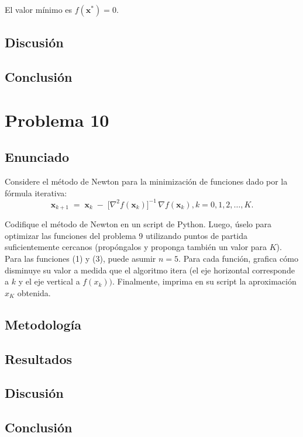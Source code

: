 \documentclass{article}
\begin{document}
El valor mínimo es $f(\mathbf{x}^*) = 0$.

\subsection{Discusión}

\subsection{Conclusión}

\section{Problema 10}

\subsection{Enunciado}
Considere el método de Newton para la minimización de funciones dado por la fórmula iterativa:
\begin{equation*}
    \mathbf{x}_{k+1} \;=\; \mathbf{x}_{k} \;-\; \bigl[\nabla^{2} f(\mathbf{x}_{k})\bigr]^{-1}\,\nabla f(\mathbf{x}_{k}), k=0,1,2,\dots,K.
\end{equation*}

Codifique el método de Newton en un script de Python. Luego, úselo para optimizar las funciones del problema 9 utilizando puntos de partida suficientemente cercanos (propóngalos y proponga también un valor para $K$). Para las funciones (1) y (3), puede asumir $n = 5$. Para cada función, grafica cómo disminuye su valor a medida que el algoritmo itera (el eje horizontal corresponde a $k$ y el eje vertical a $f(x_k))$. Finalmente, imprima en su script la aproximación $x_K$ obtenida.

\subsection{Metodología}

\subsection{Resultados}
\setcounter{equation}{0}

\subsection{Discusión}

\subsection{Conclusión}
\end{document}
